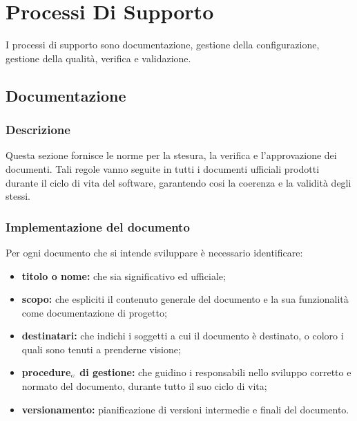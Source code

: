 \chapter{Processi Di Supporto}\label{ProcessiDiSupporto}
I processi di supporto sono documentazione, gestione della configurazione, gestione della qualità, verifica e validazione.
\section{Documentazione}\label{ProcessiDiSupportoDocumentazione}
\subsection{Descrizione}\label{ProcessiDiSupportoDocumentazioneDescrizione}
Questa sezione fornisce le norme per la stesura, la verifica e l'approvazione dei documenti. Tali regole vanno seguite in tutti i documenti ufficiali prodotti durante il ciclo di vita del software, garantendo cosi la coerenza e la validità degli stessi.
\subsection{Implementazione del documento}\label{ProcessiDiSupportoDocumentazioneImplementazioneDelDocumento}
 Per ogni documento che si intende sviluppare è necessario identificare:
\begin{itemize}
\item \textbf {titolo o nome:} che sia significativo ed ufficiale;
	\item \textbf {scopo:} che espliciti il contenuto generale del documento e la sua funzionalità come 		documentazione di progetto;
		\item \textbf {destinatari:} che indichi i soggetti a cui il documento è destinato, o coloro i quali sono tenuti a prenderne visione;
			\item \textbf {procedure$_{\scaleto{G}{3pt}}$ di gestione:} che guidino i responsabili nello sviluppo corretto e normato del documento, durante tutto il suo ciclo di vita;
				\item \textbf {versionamento:} pianificazione di versioni intermedie e finali del documento.
\end{itemize}
